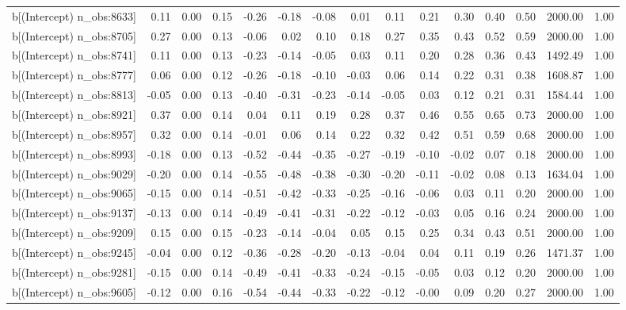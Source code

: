 \begin{table}[ht]
\begin{tabular}{rrrrrrrrrrrrrrr}
  b[(Intercept) n\_obs:8633] & 0.11 & 0.00 & 0.15 & -0.26 & -0.18 & -0.08 & 0.01 & 0.11 & 0.21 & 0.30 & 0.40 & 0.50 & 2000.00 & 1.00 \\ 
  b[(Intercept) n\_obs:8705] & 0.27 & 0.00 & 0.13 & -0.06 & 0.02 & 0.10 & 0.18 & 0.27 & 0.35 & 0.43 & 0.52 & 0.59 & 2000.00 & 1.00 \\ 
  b[(Intercept) n\_obs:8741] & 0.11 & 0.00 & 0.13 & -0.23 & -0.14 & -0.05 & 0.03 & 0.11 & 0.20 & 0.28 & 0.36 & 0.43 & 1492.49 & 1.00 \\ 
  b[(Intercept) n\_obs:8777] & 0.06 & 0.00 & 0.12 & -0.26 & -0.18 & -0.10 & -0.03 & 0.06 & 0.14 & 0.22 & 0.31 & 0.38 & 1608.87 & 1.00 \\ 
  b[(Intercept) n\_obs:8813] & -0.05 & 0.00 & 0.13 & -0.40 & -0.31 & -0.23 & -0.14 & -0.05 & 0.03 & 0.12 & 0.21 & 0.31 & 1584.44 & 1.00 \\ 
  b[(Intercept) n\_obs:8921] & 0.37 & 0.00 & 0.14 & 0.04 & 0.11 & 0.19 & 0.28 & 0.37 & 0.46 & 0.55 & 0.65 & 0.73 & 2000.00 & 1.00 \\ 
  b[(Intercept) n\_obs:8957] & 0.32 & 0.00 & 0.14 & -0.01 & 0.06 & 0.14 & 0.22 & 0.32 & 0.42 & 0.51 & 0.59 & 0.68 & 2000.00 & 1.00 \\ 
  b[(Intercept) n\_obs:8993] & -0.18 & 0.00 & 0.13 & -0.52 & -0.44 & -0.35 & -0.27 & -0.19 & -0.10 & -0.02 & 0.07 & 0.18 & 2000.00 & 1.00 \\ 
  b[(Intercept) n\_obs:9029] & -0.20 & 0.00 & 0.14 & -0.55 & -0.48 & -0.38 & -0.30 & -0.20 & -0.11 & -0.02 & 0.08 & 0.13 & 1634.04 & 1.00 \\ 
  b[(Intercept) n\_obs:9065] & -0.15 & 0.00 & 0.14 & -0.51 & -0.42 & -0.33 & -0.25 & -0.16 & -0.06 & 0.03 & 0.11 & 0.20 & 2000.00 & 1.00 \\ 
  b[(Intercept) n\_obs:9137] & -0.13 & 0.00 & 0.14 & -0.49 & -0.41 & -0.31 & -0.22 & -0.12 & -0.03 & 0.05 & 0.16 & 0.24 & 2000.00 & 1.00 \\ 
  b[(Intercept) n\_obs:9209] & 0.15 & 0.00 & 0.15 & -0.23 & -0.14 & -0.04 & 0.05 & 0.15 & 0.25 & 0.34 & 0.43 & 0.51 & 2000.00 & 1.00 \\ 
  b[(Intercept) n\_obs:9245] & -0.04 & 0.00 & 0.12 & -0.36 & -0.28 & -0.20 & -0.13 & -0.04 & 0.04 & 0.11 & 0.19 & 0.26 & 1471.37 & 1.00 \\ 
  b[(Intercept) n\_obs:9281] & -0.15 & 0.00 & 0.14 & -0.49 & -0.41 & -0.33 & -0.24 & -0.15 & -0.05 & 0.03 & 0.12 & 0.20 & 2000.00 & 1.00 \\ 
  b[(Intercept) n\_obs:9605] & -0.12 & 0.00 & 0.16 & -0.54 & -0.44 & -0.33 & -0.22 & -0.12 & -0.00 & 0.09 & 0.20 & 0.27 & 2000.00 & 1.00 \\ 

\end{tabular}
\end{table}
